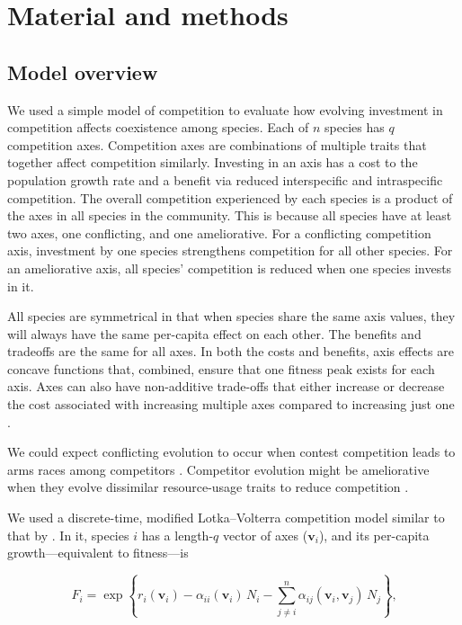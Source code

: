 
\section*{Material and methods}


\subsection*{Model overview}

We used a simple model of competition to evaluate how evolving investment in 
competition affects coexistence among species.
Each of $n$ species has $q$ competition axes.
Competition axes are combinations of multiple traits that together affect 
competition similarly.
Investing in an axis has a cost to the population growth rate and 
a benefit via reduced interspecific and intraspecific competition.
The overall competition experienced by each species is a product of 
the axes in all species in the community.
This is because all species have at least two axes, 
one conflicting, and one ameliorative.
For a conflicting competition axis, investment by one species 
strengthens competition for all other species.
For an ameliorative axis, all species' competition is reduced when
one species invests in it.


All species are symmetrical in that when species share the same axis 
values, they will always have the same per-capita effect on each other.
The benefits and tradeoffs are the same for all axes.
In both the costs and benefits, axis effects are concave functions that,
combined, ensure that one fitness peak exists for each axis.
Axes can also have non-additive trade-offs that either increase or decrease
the cost associated with increasing multiple axes compared to increasing
just one \citep{Northfield2021}.

We could expect conflicting evolution to occur when contest competition
leads to arms races among competitors
\citep{Abrams1994}.
Competitor evolution might be ameliorative when they evolve
dissimilar resource-usage traits to reduce competition \citep{Roughgarden1976}.


We used a discrete-time, modified Lotka--Volterra competition model similar to
that by \citet{Northfield2013a}.
In it, species $i$ has a length-$q$ vector of axes ($\mathbf{v}_i$), and
its per-capita growth---equivalent to fitness---is

\begin{equation} \label{eq:fitness}
    F_{i} = \exp \left\{ r_i(\mathbf{v}_i) - 
        \alpha_{ii}(\mathbf{v}_i) \, N_i - \sum_{j \ne i}^{n}{
            \alpha_{ij}(\mathbf{v}_i, \mathbf{v}_j) \, N_j}  
    \right\}\textrm{,}
\end{equation}

